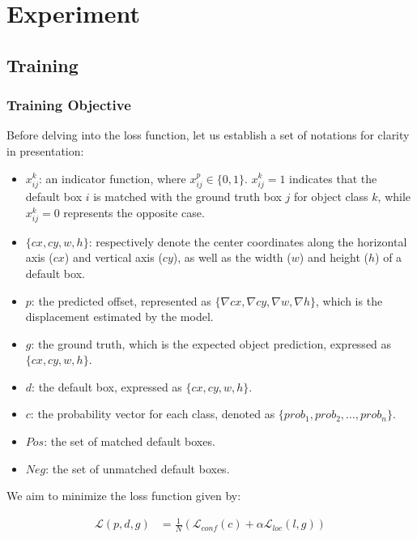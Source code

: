 \documentclass[a4paper]{article}
\begin{document}
		
	\section{Experiment}
	
	\subsection{Training}
	
	\subsubsection{Training Objective}
	
	Before delving into the loss function, let us establish a set of notations for clarity in presentation:

	\begin{itemize}
		\item $x_{ij}^k$: an indicator function, where $x_{ij}^p \in \lbrace 0, 1 \rbrace$. $x_{ij}^k = 1$ indicates that the default box $i$ is matched with the ground truth box $j$ for object class $k$, while $x_{ij}^k = 0$ represents the opposite case.
		\item $\lbrace cx, cy, w, h \rbrace$: respectively denote the center coordinates along the horizontal axis ($cx$) and vertical axis ($cy$), as well as the width ($w$) and height ($h$) of a default box.
		\item $p$: the predicted offset, represented as $\lbrace \nabla{cx}, \nabla{cy}, \nabla{w}, \nabla{h} \rbrace$, which is the displacement estimated by the model.
		\item $g$: the ground truth, which is the expected object prediction, expressed as $\lbrace cx, cy, w, h \rbrace$.
		\item $d$: the default box, expressed as $\lbrace cx, cy, w, h \rbrace$.
		\item $c$: the probability vector for each class, denoted as $\lbrace prob_1, prob_2, \ldots, prob_n \rbrace$.
		\item $Pos$: the set of matched default boxes.
		\item $Neg$: the set of unmatched default boxes.
	\end{itemize}
	
	
We aim to minimize the loss function given by:

\begin{align}
	\mathcal{L}(p, d, g) &= \frac{1}{N}(\mathcal{L}_{conf}(c) + \alpha \mathcal{L}_{loc}(l, g)) 
\end{align} 
\end{document}
